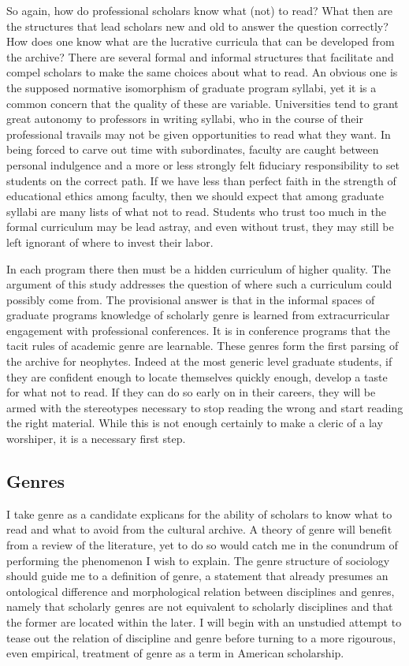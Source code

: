 \documentclass[]{book}
\theoremstyle{definition}
\theoremstyle{definition}
\theoremstyle{definition}
\theoremstyle{remark}
\begin{document}
So again, how do professional scholars know what (not) to read? What
then are the structures that lead scholars new and old to answer the
question correctly? How does one know what are the lucrative curricula
that can be developed from the archive? There are several formal and
informal structures that facilitate and compel scholars to make the same
choices about what to read. An obvious one is the supposed normative
isomorphism of graduate program syllabi, yet it is a common concern that
the quality of these are variable. Universities tend to grant great
autonomy to professors in writing syllabi, who in the course of their
professional travails may not be given opportunities to read what they
want. In being forced to carve out time with subordinates, faculty are
caught between personal indulgence and a more or less strongly felt
fiduciary responsibility to set students on the correct path. If we have
less than perfect faith in the strength of educational ethics among
faculty, then we should expect that among graduate syllabi are many
lists of what not to read. Students who trust too much in the formal
curriculum may be lead astray, and even without trust, they may still be
left ignorant of where to invest their labor.

In each program there then must be a hidden curriculum of higher
quality. The argument of this study addresses the question of where such
a curriculum could possibly come from. The provisional answer is that in
the informal spaces of graduate programs knowledge of scholarly genre is
learned from extracurricular engagement with professional conferences.
It is in conference programs that the tacit rules of academic genre are
learnable. These genres form the first parsing of the archive for
neophytes. Indeed at the most generic level graduate students, if they
are confident enough to locate themselves quickly enough, develop a
taste for what not to read. If they can do so early on in their careers,
they will be armed with the stereotypes necessary to stop reading the
wrong and start reading the right material. While this is not enough
certainly to make a cleric of a lay worshiper, it is a necessary first
step.

\hypertarget{genres}{%
\subsection{Genres}\label{genres}}

I take genre as a candidate explicans for the ability of scholars to
know what to read and what to avoid from the cultural archive. A theory
of genre will benefit from a review of the literature, yet to do so
would catch me in the conundrum of performing the phenomenon I wish to
explain. The genre structure of sociology should guide me to a
definition of genre, a statement that already presumes an ontological
difference and morphological relation between disciplines and genres,
namely that scholarly genres are not equivalent to scholarly disciplines
and that the former are located within the later. I will begin with an
unstudied attempt to tease out the relation of discipline and genre
before turning to a more rigourous, even empirical, treatment of genre
as a term in American scholarship.
\end{document}
